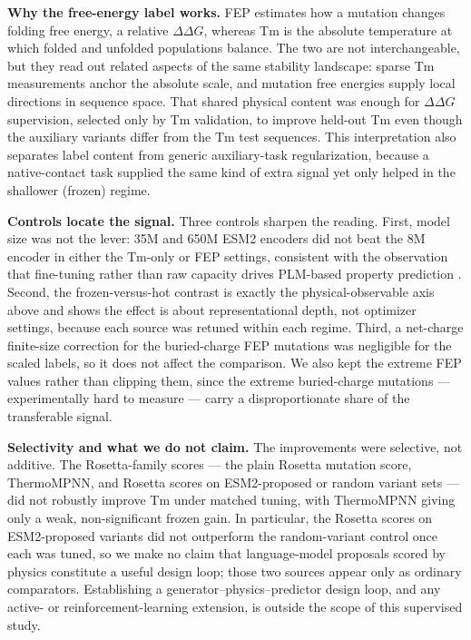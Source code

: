 \textbf{Why the free-energy label works.} FEP estimates how a mutation changes
folding free energy, a relative $\Delta\Delta G$, whereas Tm is the absolute
temperature at which folded and unfolded populations balance. The two are not
interchangeable, but they read out related aspects of the same stability landscape:
sparse Tm measurements anchor the absolute scale, and mutation free energies supply
local directions in sequence space. That shared physical content was enough for
$\Delta\Delta G$ supervision, selected only by Tm validation, to improve held-out
Tm even though the auxiliary variants differ from the Tm test sequences. This
interpretation also separates label content from generic auxiliary-task
regularization, because a native-contact task supplied the same kind of extra
signal yet only helped in the shallower (frozen) regime.

\textbf{Controls locate the signal.} Three controls sharpen the reading. First,
model size was not the lever: 35M and 650M ESM2 encoders did not beat the 8M
encoder in either the Tm-only or FEP settings, consistent with the observation that
fine-tuning rather than raw capacity drives PLM-based property prediction
\citep{Schmirler2024FineTuning}. Second, the frozen-versus-hot contrast is exactly
the physical-observable axis above and shows the effect is about representational
depth, not optimizer settings, because each source was retuned within each regime.
Third, a net-charge finite-size correction for the buried-charge FEP mutations was
negligible for the scaled labels, so it does not affect the comparison. We also
kept the extreme FEP values rather than clipping them, since the extreme
buried-charge mutations --- experimentally hard to measure --- carry a
disproportionate share of the transferable signal.

\textbf{Selectivity and what we do not claim.} The improvements were selective, not
additive. The Rosetta-family scores --- the plain Rosetta mutation score, ThermoMPNN,
and Rosetta scores on ESM2-proposed or random variant sets --- did not robustly
improve Tm under matched tuning, with ThermoMPNN giving only a weak, non-significant
frozen gain. In particular, the Rosetta scores on ESM2-proposed variants did not
outperform the random-variant control once each was tuned, so we make no claim that
language-model proposals scored by physics constitute a useful design loop; those
two sources appear only as ordinary comparators. Establishing a generator--physics--predictor
design loop, and any active- or reinforcement-learning extension, is outside the
scope of this supervised study.

